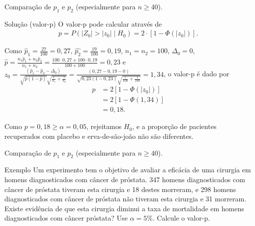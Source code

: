 \documentclass[9pt]{beamer}
\begin{document}
\begin{frame}{Comparação de $p_1$ e $p_2$ (especialmente para $n 
	\geq 40$).}

\begin{block}{Solução (valor-p)}
	O valor-p pode calcular através de
	\begin{align*}
		p = P\left( \lvert Z_0 \rvert > \lvert z_0 \rvert \mid H_0 \right) = 2 \cdot \left[ 1 - \Phi(\lvert z_0 \rvert) \right].
	\end{align*}
	
	Como $\hat{p}_1 = \frac{27}{100} = 0,27$, $\hat{p_2} = \frac{19}{100}=0,19$, $n_1=n_2=100$, $\Delta_0=0$, $\hat{p} = \frac{n_1 \hat{p}_1 + n_2 \hat{p}_2}{n_1 + n_2} = \frac{100\cdot 0,27 + 100\cdot 0,19}{100 + 100} = 0,23$ e $z_0 = \frac{(\hat{p}_1 - \hat{p}_2 - \Delta_0)}{\sqrt{\hat{p}(1 - \hat{p})}\sqrt{\frac{1}{n_1} + \frac{1}{n_2}}} = \frac{(0,27 - 0,19 - 0)}{\sqrt{0,23(1 - 0,23)}\sqrt{\frac{1}{100} + \frac{1}{100}}} = 1,34$, o valor-p é dado por
	\begin{align*}
		p &= 2 \left[ 1 - \Phi \left( \lvert z_0 \rvert \right)\right]\\
		&= 2 \left[ 1 - \Phi \left( 1,34 \right)  \right]\\
		&= 0,18.
	\end{align*}
	
	Como $p=0,18 \geq \alpha = 0,05$, rejeitamos $H_0$, e a proporção de pacientes recuperados com placebo e erva-de-são-joão não são diferentes.
\end{block}

\end{frame}

\begin{frame}{Comparação de $p_1$ e $p_2$ (especialmente para $n 
	\geq 40$).}

\large
\begin{block}{Exemplo}
	Um experimento tem o objetivo de avaliar a eficácia de uma cirurgia em homens diagnosticados com câncer de próstata. 347 homens diagnosticados com câncer de próstata tiveram esta cirurgia e 18 destes morreram, e 298 homens diagnosticados com câncer de próstata não tiveram esta cirurgia e 31 morreram. Existe evidência de que esta cirurgia diminui a taxa de mortalidade em homens diagnosticados com câncer próstata? Use $\alpha=5\%$. Calcule o valor-p.
\end{block}
\normalsize

\end{frame}
\end{document}
